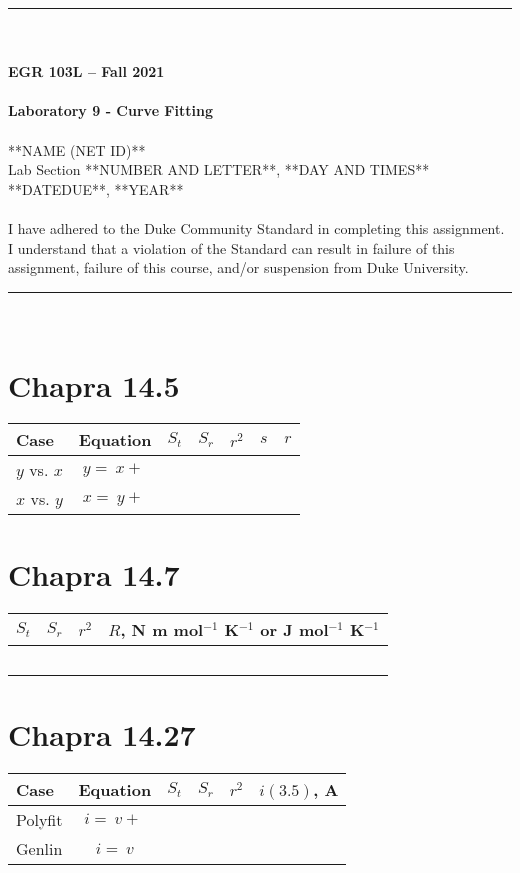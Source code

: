 \documentclass{article}
\begin{document}
\begin{center}
\rule{6.5in}{0.5mm}\\~\\
\textbf{\large EGR 103L -- Fall 2021}\\~\\
\textbf{\huge Laboratory 9 - Curve Fitting}\\~\\
**NAME (NET ID)**\\
Lab Section **NUMBER AND LETTER**, **DAY AND TIMES**\\
**DATEDUE**, **YEAR**\\~\\
{\small I have adhered to the Duke Community Standard in completing this assignment.  I understand that a violation of the Standard can result in failure of this assignment, failure of this course, and/or suspension from Duke University.} 
\rule{6.5in}{0.5mm}\\
\end{center}
\tableofcontents
\listoffigures
\renewcommand{\arraystretch}{1.5}
\clearpage

\section{Chapra 14.5}
\begin{center}
\begin{tabular}{l|c|c|c|c|c|c}
Case & Equation & $S_t$ & $S_r$ & $r^2$ & $s$ & $r$ \\ \hline
$y$ vs. $x$ & $y=~x+~$ & ~ & 
~ & ~ & ~ & ~\\ 
$x$ vs. $y$ & $x=~y+~$ & ~ & 
~ & ~ & ~ & ~
\end{tabular}
\end{center}

\section{Chapra 14.7}
\begin{center}
\begin{tabular}{c|c|c|c}
$S_t$ & $S_r$ & $r^2$ & $R$, N m mol$^{-1}$ K$^{-1}$ or J  mol$^{-1}$ K$^{-1}$\\ \hline
~ & ~  & ~ & ~
\end{tabular}
\end{center}

\section{Chapra 14.27}
\begin{center}
\begin{tabular}{l|c|c|c|c|c}
Case & Equation & $S_t$ & $S_r$ & $r^2$ & $i(3.5)$, A\\ \hline
Polyfit & $i=~v+~$ & ~ & 
~ & ~ & ~\\ 
Genlin & $i=~v$ & ~ &
~ & ~ & ~
\end{tabular}
\end{center}
\end{document}

